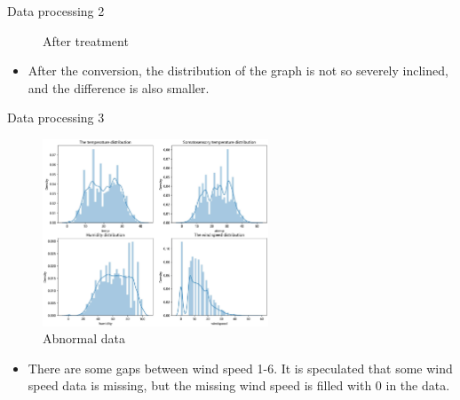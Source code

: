 \documentclass[
  size=14pt,
  paper=smartboard,  %
  mode=present, 		%
  display=slides, 	%
  style=tuliplab,  	%
  pauseslide,
  fleqn,leqno]{powerdot}
\begin{document}
\begin{slide}{Data processing 2}
\begin{figure}[htbp]
\begin{minipage}[t]{0.48\textwidth}
          \vspace{-1.4em}
          \caption{After treatment}
          \end{minipage}
          \end{figure}
          \begin{itemize}
            \item
            After the conversion, the distribution of the graph is not so severely inclined, and the difference is also smaller.
      
            \end{itemize}
        \end{slide}

        \begin{slide}{Data processing 3}
          
            \begin{figure}[htb]
              \centering
              \includegraphics[width=0.6\textwidth,trim=60 60 60 60,clip]{figures//anlysis.eps}
              \vspace{-1.3em}
              \caption{Abnormal data}
            \end{figure}
            \vspace{-1.4em}
            \begin{itemize}
              \item
              There are some gaps between wind speed 1-6. It is speculated that some wind speed data is missing, but the missing wind speed is filled with 0 in the data.
              \end{itemize}
           
          \end{slide}
\end{document}

